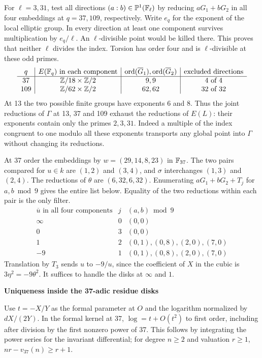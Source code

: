 \documentclass[12pt]{article}
\newcommand{\head}[1]{{\Large\bfseries\color{ink}#1}\par\smallskip}
\begin{document}
For $\ell=3,31$, test all directions $(a:b)\in\mathbb P^1(\mathbb F_\ell)$ by reducing $aG_1+bG_2$ in all four embeddings at $q=37,109$, respectively. Write $e_q$ for the exponent of the local elliptic group. In every direction at least one component survives multiplication by $e_q/\ell$. An $\ell$-divisible point would be killed there. This proves that neither $\ell$ divides the index. Torsion has order four and is $\ell$-divisible at these odd primes.
\[
\begin{array}{c|c|c|c}
 q & E(\mathbb F_q)\text{ in each component} & \operatorname{ord}(\overline G_1),\operatorname{ord}(\overline G_2)
  & \text{excluded directions}\\ \hline
 37 & \mathbb Z/18\times\mathbb Z/2 & 9,9 & 4\text{ of }4\\
 109 & \mathbb Z/62\times\mathbb Z/2 & 62,62 &32\text{ of }32
\end{array}
\]
At 13 the two possible finite groups have exponents 6 and 8. Thus the joint reductions of $\Gamma$ at 13, 37 and 109 exhaust the reductions of $E(L)$: their exponents contain only the primes $2,3,31$. Indeed a multiple of the index congruent to one modulo all these exponents transports any global point into $\Gamma$ without changing its reductions.

At 37 order the embeddings by $w=(29,14,8,23)$ in $\mathbb F_{37}$. The two pairs compared for $u\in k$ are $(1,2)$ and $(3,4)$, and $\sigma$ interchanges $(1,3)$ and $(2,4)$. The reductions of $\theta$ are $(6,32,6,32)$. Enumerating $aG_1+bG_2+T_j$ for $a,b\bmod9$ gives the entire list below. Equality of the two reductions within each pair is the only filter.
\[
\begin{array}{c|c|l}
 \overline u\text{ in all four components}&j&(a,b)\bmod9\\ \hline
 \infty&0&(0,0)\\
 0&3&(0,0)\\
 1&2&(0,1),(0,8),(2,0),(7,0)\\
 -9&1&(0,1),(0,8),(2,0),(7,0)
\end{array}
\]
Translation by $T_3$ sends $u$ to $-9/u$, since the coefficient of $X$ in the cubic is $3\eta^2=-9\theta^2$. It suffices to handle the disks at $\infty$ and $1$.

\newpage
\head{Uniqueness inside the 37-adic residue disks}
Use $t=-X/Y$ as the formal parameter at $O$ and the logarithm normalized by $dX/(2Y)$. In the formal kernel at 37, $\log=t+O(t^2)$ to first order, including after division by the first nonzero power of 37. This follows by integrating the power series for the invariant differential; for degree $n\ge2$ and valuation $r\ge1$, $nr-v_{37}(n)\ge r+1$.
\end{document}
